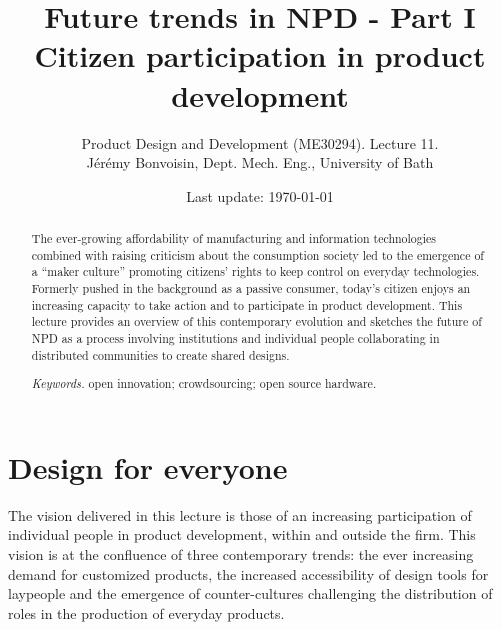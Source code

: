 \documentclass{article}
\begin{document}
\title{Future trends in NPD - Part I\\Citizen participation in product development}

\author{Product Design and Development (ME30294). Lecture 11. \\ Jérémy Bonvoisin, Dept. Mech. Eng., University of Bath}
\date{Last update: \today}

\maketitle

\begin{abstract}
The ever-growing affordability of manufacturing and information technologies combined with raising criticism about the consumption society led to the emergence of a ``maker culture'' promoting citizens' rights to keep control on everyday technologies. Formerly pushed in the background as a passive consumer, today's citizen enjoys an increasing capacity to take action and to participate in product development. This lecture provides an overview of this contemporary evolution and sketches the future of NPD as a process involving institutions and individual people collaborating in distributed communities to create shared designs.

{{\it Keywords.} open innovation; crowdsourcing; open source hardware.}
\end{abstract}

\tableofcontents

\section{Design for everyone}
\label{sec:context}
The vision delivered in this lecture is those of an increasing participation of individual people in product development, within and outside the firm. This vision is at the confluence of three contemporary trends: the ever increasing demand for customized products, the increased accessibility of design tools for laypeople and the emergence of counter-cultures challenging the distribution of roles in the production of everyday products. 
\end{document}
